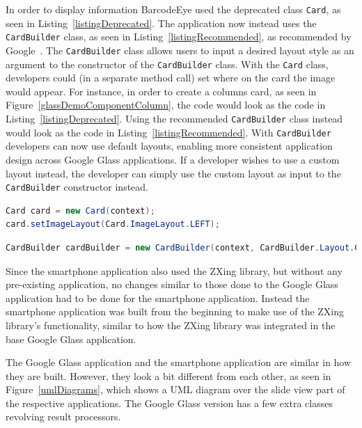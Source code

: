In order to display information BarcodeEye used the deprecated class \texttt{Card}, as seen in Listing~\ref{listingDeprecated}. The application now instead uses the \texttt{CardBuilder} class, as seen in Listing~\ref{listingRecommended}, as recommended by Google~\cite{googleCard}. The \texttt{CardBuilder} class allows users to input a desired layout style as an argument to the constructor of the \texttt{CardBuilder} class. With the \texttt{Card} class, developers could (in a separate method call) set where on the card the image would appear. For instance, in order to create a columns card, as seen in Figure~\ref{glassDemoComponentColumn}, the code would look as the code in Listing~\ref{listingDeprecated}. Using the recommended \texttt{CardBuilder} class instead would look as the code in Listing~\ref{listingRecommended}. With \texttt{CardBuilder} developers can now use default layouts, enabling more consistent application design across Google Glass applications. If a developer wishes to use a custom layout instead, the developer can simply use the custom layout as input to the \texttt{CardBuilder} constructor instead.

\begin{lstlisting}[language=Java, caption={Instancing of the deprecated class Card}, label=listingDeprecated]
Card card = new Card(context);
card.setImageLayout(Card.ImageLayout.LEFT);
\end{lstlisting}

\begin{lstlisting}[language=Java, caption={Instancing of the recommended class CardBuilder}, label=listingRecommended]
CardBuilder cardBuilder = new CardBuilder(context, CardBuilder.Layout.COLUMNS);
\end{lstlisting}

Since the smartphone application also used the ZXing library, but without any pre-existing application, no changes similar to those done to the Google Glass application had to be done for the smartphone application. Instead the smartphone application was built from the beginning to make use of the ZXing library's functionality, similar to how the ZXing library was integrated in the base Google Glass application.

The Google Glass application and the smartphone application are similar in how they are built. However, they look a bit different from each other, as seen in Figure~\ref{umlDiagrams}, which shows a UML diagram over the slide view part of the respective applications. The Google Glass version has a few extra classes revolving result processors.

